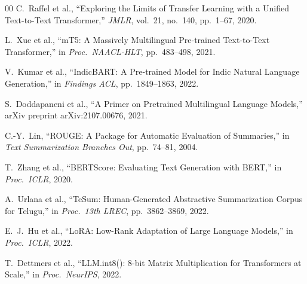 \documentclass[runningheads]{llncs}
\begin{document}
\begin{thebibliography}{00}
C.~Raffel et al., ``Exploring the Limits of Transfer
Learning with a Unified Text-to-Text Transformer,''
\textit{JMLR}, vol.~21, no.~140, pp.~1--67, 2020.

L.~Xue et al., ``mT5: A Massively Multilingual Pre-trained
Text-to-Text Transformer,'' in \textit{Proc.\ NAACL-HLT},
pp.~483--498, 2021.

V.~Kumar et al., ``IndicBART: A Pre-trained Model for
Indic Natural Language Generation,''
in \textit{Findings ACL}, pp.~1849--1863, 2022.

S.~Doddapaneni et al., ``A Primer on Pretrained
Multilingual Language Models,''
arXiv preprint arXiv:2107.00676, 2021.

C.-Y.~Lin, ``ROUGE: A Package for Automatic Evaluation
of Summaries,'' in \textit{Text Summarization Branches Out},
pp.~74--81, 2004.

T.~Zhang et al., ``BERTScore: Evaluating Text Generation
with BERT,'' in \textit{Proc.\ ICLR}, 2020.

A.~Urlana et al., ``TeSum: Human-Generated Abstractive
Summarization Corpus for Telugu,''
in \textit{Proc.\ 13th LREC}, pp.~3862--3869, 2022.

E.~J.~Hu et al., ``LoRA: Low-Rank Adaptation of Large
Language Models,'' in \textit{Proc.\ ICLR}, 2022.

T.~Dettmers et al., ``LLM.int8(): 8-bit Matrix Multiplication
for Transformers at Scale,'' in \textit{Proc.\ NeurIPS}, 2022.

\end{thebibliography}
\end{document}
